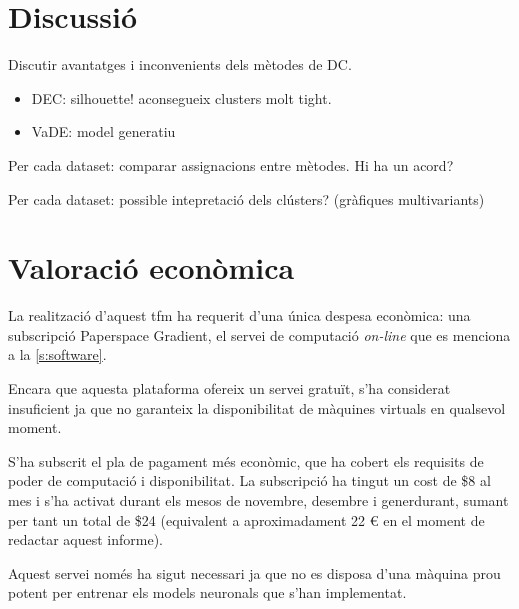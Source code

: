 \documentclass[CAT,BIB]{TFUOC}%
\newcommand{\todo}[1]{
            \begin{tcolorbox}[title=ToDo!, colback=red!5!white, colframe=red!50!black, coltext=red!50!black]
            #1
            \end{tcolorbox}}
\begin{document}
\chapter{Discussió}
\label{c:discussio}

\todo{Discutir avantatges i inconvenients dels mètodes de DC.
    \begin{itemize}
        \item DEC: silhouette! aconsegueix clusters molt tight.
        \item VaDE: model generatiu
    \end{itemize}

    Per cada dataset: comparar assignacions entre mètodes. Hi ha un acord?

    Per cada dataset: possible intepretació dels clústers? (gràfiques multivariants)
}

\chapter{Valoració econòmica}
\label{c:economic}

    La realització d'aquest \gls{tfm} ha requerit d'una única despesa econòmica:
    una subscripció Paperspace Gradient,
    el servei de computació \textit{on-line}
    que es menciona a la \cref{s:software}.

    Encara que aquesta plataforma ofereix un servei gratuït,
    s'ha considerat insuficient
    ja que no garanteix la disponibilitat de màquines virtuals en qualsevol moment.

    S'ha subscrit el pla de pagament més econòmic,
    que ha cobert els requisits de poder de computació
    i disponibilitat.
    La subscripció ha tingut un cost de \$8 al mes
    i s'ha activat durant els mesos de novembre, desembre i generdurant,
    sumant per tant un total de \$24
    (equivalent a aproximadament 22 € en el moment de redactar aquest informe).

    Aquest servei només ha sigut necessari
    ja que no es disposa d'una màquina prou potent
    per entrenar els models neuronals que s'han implementat.
\end{document}
